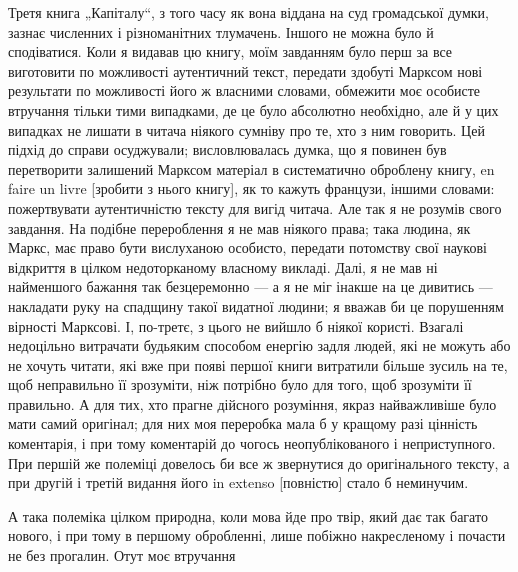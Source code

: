 
Третя книга „Капіталу“, з того часу як вона віддана на суд громадської думки, зазнає численних і
різноманітних тлумачень. Іншого не можна було й сподіватися. Коли я видавав цю книгу, моїм
завданням було перш за все виготовити по можливості аутентичний текст, передати здобуті Марксом
нові результати по можливості його ж власними словами, обмежити моє особисте втручання тільки тими випадками, де це
було абсолютно необхідно, але й у цих випадках не лишати в читача ніякого
сумніву про те, хто з ним говорить. Цей підхід до справи осуджували; висловлювалась думка, що я
повинен був перетворити залишений Марксом матеріал в систематично оброблену книгу, en faire un
livre [зробити з нього книгу], як то кажуть французи, іншими словами: пожертвувати аутентичністю
тексту для вигід читача. Але так я не розумів свого завдання. На подібне перероблення я не мав
ніякого права; така людина, як Маркс, має право бути вислуханою особисто, передати потомству
свої наукові відкриття в цілком недоторканому власному викладі. Далі, я не мав ні найменшого
бажання так безцеремонно — а я не міг інакше на це дивитись — накладати руку на спадщину такої видатної людини; я вважав би це порушенням вірності Марксові. І, по-третє, з цього не вийшло б
ніякої користі. Взагалі недоцільно витрачати будьяким способом енергію задля людей, які не можуть або не хочуть читати, які вже при появі першої книги витратили більше зусиль на те, щоб
неправильно її зрозуміти, ніж потрібно було для того, щоб зрозуміти її правильно. А для тих, хто
прагне дійсного розуміння, якраз найважливіше було мати самий оригінал; для них моя переробка
мала б у кращому разі цінність коментарія, і при тому коментарій до чогось неопублікованого і
неприступного. При першій же полеміці довелось би все ж звернутися до оригінального тексту, а
при другій і третій видання його in extenso [повністю] стало б неминучим.

А така полеміка цілком
природна, коли мова йде про твір, який дає так багато нового, і при тому в першому обробленні,
лише побіжно накресленому і почасти не без прогалин. Отут моє втручання

\parbreak{}  %
